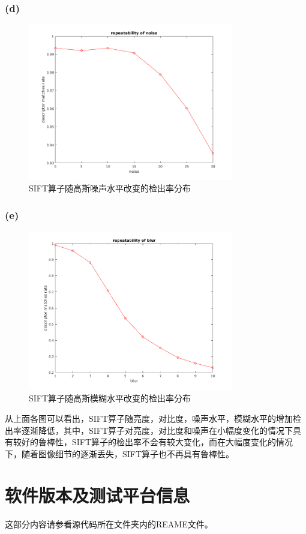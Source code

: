 \documentclass[a4paper, UTF8]{ctexrep}
\begin{document}
			\subsubsection{(d)}
				\begin{figure}[htbp!]
					\centering
					\includegraphics[width=0.8\textwidth]{hw1_fig18.png}
					\caption{SIFT算子随高斯噪声水平改变的检出率分布}
				\end{figure}
			\clearpage
			\subsubsection{(e)}
				\begin{figure}[htbp!]
					\centering
					\includegraphics[width=0.8\textwidth]{hw1_fig19.png}
					\caption{SIFT算子随高斯模糊水平改变的检出率分布}
				\end{figure}
		从上面各图可以看出，SIFT算子随亮度，对比度，噪声水平，模糊水平的增加检出率逐渐降低，其中，SIFT算子对亮度，对比度和噪声在小幅度变化的情况下具有较好的鲁棒性，SIFT算子的检出率不会有较大变化，而在大幅度变化的情况下，随着图像细节的逐渐丢失，SIFT算子也不再具有鲁棒性。

  \section{软件版本及测试平台信息}
    这部分内容请参看源代码所在文件夹内的REAME文件。
\end{document}

